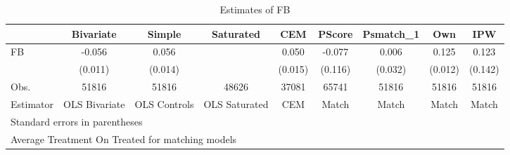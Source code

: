 \begin{table}[htbp]\centering
\caption{Estimates of FB}
\begin{tabular}{l*{8}{c}}
\hline\hline
                    &   Bivariate&      Simple&   Saturated&         CEM&      PScore&   Psmatch\_1&         Own&         IPW\\
\hline
\hline
FB                  &      -0.056&       0.056&            &       0.050&      -0.077&       0.006&       0.125&       0.123\\
                    &     (0.011)&     (0.014)&            &     (0.015)&     (0.116)&     (0.032)&     (0.012)&     (0.142)\\
Obs.                &       51816&       51816&       48626&       37081&       65741&       51816&       51816&       51816\\
Estimator           &OLS Bivariate&OLS Controls&OLS Saturated&         CEM&       Match&       Match&       Match&       Match\\
\hline\hline
\multicolumn{9}{l}{\footnotesize Standard errors in parentheses}\\
\multicolumn{9}{l}{\footnotesize Average Treatment On Treated for matching models}\\
\end{tabular}
\end{table}

